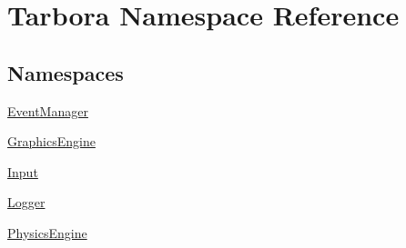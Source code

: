 \hypertarget{namespaceTarbora}{}\section{Tarbora Namespace Reference}
\label{namespaceTarbora}
\subsection*{Namespaces}
\begin{DoxyCompactItemize}
\item 
 \hyperlink{namespaceTarbora_1_1EventManager}{Event\+Manager}
\item 
 \hyperlink{namespaceTarbora_1_1GraphicsEngine}{Graphics\+Engine}
\item 
 \hyperlink{namespaceTarbora_1_1Input}{Input}
\item 
 \hyperlink{namespaceTarbora_1_1Logger}{Logger}
\item 
 \hyperlink{namespaceTarbora_1_1PhysicsEngine}{Physics\+Engine}
\end{DoxyCompactItemize}
